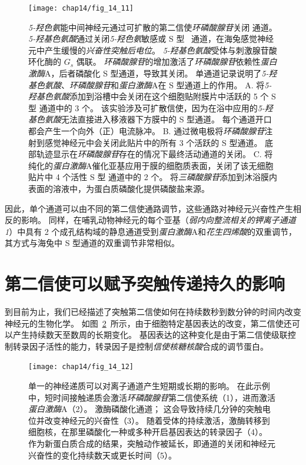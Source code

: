 \begin{figure}[htbp]
	\centering
	\texttt{[image: chap14/fig\_14\_11]}
	\caption{\textit{5-羟色氨}能中间神经元通过可扩散的第二信使\textit{环磷酸腺苷}关闭  通道。
		\textit{5-羟基色氨酸}通过关闭\textit{5-羟色氨}敏感或 S 型~ 通道，在海兔感觉神经元中产生缓慢的\textit{兴奋性突触后电位}。
		\textit{5-羟基色氨酸}受体与刺激腺苷酸环化酶的 $ G_s $ 偶联。
		\textit{环磷酸腺苷}的增加激活了\textit{环磷酸腺苷}依赖性\textit{蛋白激酶}A，后者磷酸化 S 型通道，导致其关闭。
		单通道记录说明了\textit{5-羟基色氨酸}、\textit{环磷酸腺苷}和\textit{蛋白激酶}A在 S 型通道上的作用。
		A. 将\textit{5-羟基色氨酸}添加到浴槽中会关闭在这个细胞贴附膜片中活跃的 5 个 S 型  通道中的 3 个。
		该实验涉及可扩散信使，因为在浴中应用的\textit{5-羟基色氨酸}无法直接进入移液器下方膜中的 S 型通道。
		每个通道开口都会产生一个向外（正）电流脉冲\cite{siegelbaum1982serotonin}。
		B. 通过微电极将\textit{环磷酸腺苷}注射到感觉神经元中会关闭此贴片中的所有 3 个活跃的 S 型通道。
		底部轨迹显示在\textit{环磷酸腺苷}存在的情况下最终活动通道的关闭\cite{siegelbaum1982serotonin}。
		C. 将纯化的\textit{蛋白激酶}A催化亚基应用于膜的细胞质表面，关闭了该无细胞贴片中 4 个活性 S 型  通道中的 2 个。
		将\textit{三磷酸腺苷}添加到沐浴膜内表面的溶液中，为蛋白质磷酸化提供磷酸盐来源\cite{shuster1985cyclic}。}
	\label{fig:14_11}
\end{figure}


因此，单个通道可以由不同的第二信使通路调节，这些通路对神经元兴奋性产生相反的影响。
同样，在哺乳动物神经元的每个亚基（\textit{弱内向整流相关的钾离子通道 1}）中具有 2 个成孔结构域的静息通道受到\textit{蛋白激酶}A和\textit{花生四烯酸}的双重调节，其方式与海兔中 S 型通道的双重调节非常相似。



\section{第二信使可以赋予突触传递持久的影响}

到目前为止，我们已经描述了突触第二信使如何在持续数秒到数分钟的时间内改变神经元的生物化学。
如图~\ref{fig:14_12}~所示，由于细胞特定基因表达的改变，第二信使还可以产生持续数天至数周的长期变化。
基因表达的这种变化是由于第二信使级联控制转录因子活性的能力，转录因子是控制\textit{信使核糖核酸}合成的调节蛋白。


\begin{figure}[htbp]
	\centering
	\texttt{[image: chap14/fig\_14\_12]}
	\caption{单一的神经递质可以对离子通道产生短期或长期的影响。
		在此示例中，短时间接触递质会激活\textit{环磷酸腺苷}第二信使系统（1），进而激活\textit{蛋白激酶}A（2）。
		激酶磷酸化通道；
		这会导致持续几分钟的突触电位并改变神经元的兴奋性（3）。
		随着受体的持续激活，激酶转移到细胞核，在那里磷酸化一种或多种开启基因表达的转录因子（4）。
		作为新蛋白质合成的结果，突触动作被延长，即通道的关闭和神经元兴奋性的变化持续数天或更长时间（5）。}
	\label{fig:14_12}
\end{figure}


